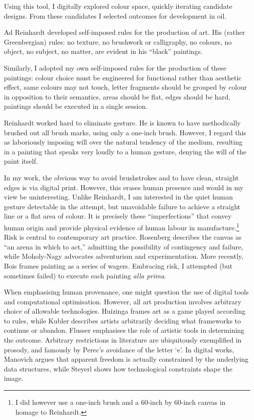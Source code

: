 \documentclass[12pt]{article}
\begin{document}
Using this tool, I digitally explored colour space, quickly iterating
candidate designs. From these candidates I selected outcomes for
development in oil.

Ad Reinhardt developed self-imposed rules for the production of
art.\autocite[pp.~203--207]{artasart} His (rather Greenbergian) rules: no
texture, no brushwork or calligraphy, no colours, no object, no
subject, no matter, are evident in his ``black'' paintings.

Similarly, I adopted my own self-imposed rules for the production of
these paintings: colour choice must be engineered for functional
rather than aesthetic effect, same colours may not touch, letter
fragments should be grouped by colour in opposition to their
semantics, areas should be flat, edges should be hard, paintings
should be executed in a single session.

Reinhardt worked hard to eliminate gesture. He is known to have
methodically brushed out all brush marks, using only a one-inch
brush.\autocite[p.~206]{artasart} However, I regard this as 
laboriously imposing will over the natural tendency of the medium,
resulting in a painting that speaks very loudly to a human gesture,
denying the will of the paint itself.

In my work, the obvious way to avoid brushstrokes and to have clean,
straight edges is via digital print. However, this erases human
presence and would in my view be uninteresting. Unlike Reinhardt, I am
interested in the quiet human gesture detectable in the attempt, but
unavoidable failure to achieve a straight line or a flat area of
colour. It is precisely these ``imperfections'' that convey human
origin and provide physical evidence of human labour in
manufacture.\footnote{I did however use a one-inch brush and a 60-inch
  by 60-inch canvas in homage to Reinhardt.} Risk is central to
contemporary art practice. Rosenberg describes the canvas as ``an
arena in which to act,''\autocite[p.~22]{rosenberg1952american} admitting
the possibility of contingency and failure, while Moholy-Nagy
advocates adventurism and
experimentation.\autocite[pp.~274--276]{moholy1947vision} More recently, Bois
frames painting as a series of wagers.\autocite[p.~229]{bois1990painting}
Embracing risk, I attempted (but sometimes failed) to execute each
painting \emph{alla prima}.

When emphasising human provenance, one might question the use of
digital tools and computational optimisation. However, all art
production involves arbitrary choice of allowable
technologies. Huizinga frames art as a game played according to
rules,\autocite{huizinga1938homo} while Kubler describes artists
arbitrarily deciding what frameworks to continue or
abandon.\autocite{kubler1962shape} Flusser emphasises the role of artistic
tools in determining the outcome.\autocite{flusser2000towards} Arbitrary
restrictions in literature are ubiquitously exemplified in prosody,
and famously by Perec's avoidance of the letter
`e'.\autocite{perec1969disparition} In digital works, Manovich argues that apparent freedom is actually constrained by the underlying data structures,\autocite{manovich2001language} while Steyerl shows how technological constraints shape the image.\autocite{steyerl2009poorimage}
\end{document}
